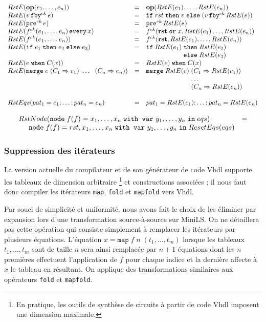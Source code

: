\documentclass[a4paper]{article}
\newcommand{\minils}{{\sc MiniLS}}
\newcommand{\vhdl}{{\sc Vhdl}}
\newcommand{\mybox}[1]{\mbox{\tt{#1}}}
\newcommand{\ind}[0]{\hspace{0.5cm}}
\newcommand{\Node}[4]{\mybox{node} \; f(#1) = #2 \; \mybox{with var} \
  #3 \; \mybox{in} \; #4}
\newcommand{\Op}[2]{\mybox{\bf{op}}(#1,\dots,#2)}
\newcommand{\Fby}[2]{#1 \, \mybox{fby}^{ck} \, #2}
\newcommand{\Pre}[1]{\mybox{pre}^{ck} \, #1}
\newcommand{\Every}[4]{#1^{ck}(#2,\dots,#3) \, \mybox{every} \, #4}
\newcommand{\App}[2]{#1^{ck}(#2)}
\newcommand{\If}[3]{\mybox{if} \; #1 \; \mybox{then} \; #2 \; \mybox{else} \; #3}
\newcommand{\When}[3]{#1 \; \mybox{when} \; #2(#3)}
\newcommand{\Merge}[5]{\mybox{merge} \; #1 \; (#2 \Rightarrow #3) \; \dots \; \
  (#4 \Rightarrow #5)}
\newcommand{\Map}[3]{\mathtt{map} \; #1\; n\; (#2,\dots,#3)}
\begin{document}
\[
\begin{array}{lcl}
  \re{\Op{e_1}{e_n}} & = & \Op{\re{e_1}}{\re{e_n}} \\
  \re{\Fby{v}{e}} & = & \If{rst}{v}{(\Fby{v}{\re{e}})} \\
  \re{\Pre{e}} & = & \Pre{\re{e}} \\
  \re{\Every{f}{e_1}{e_n}{x}} & = & \App{f}{\mathbf{rst} \; \mathtt{or} \;
    x, \re{e_1} \dots, \re{e_n}} \\
  \re{\App{f}{e_1,\dots,e_n}} & = &
  \App{f}{\mathbf{rst},\re{e_1},\dots,\re{e_n}} \\
  \re{\If{e_1}{e_2}{e_3}} & = & \If{\re{e_1}}{\re{e_2}\\ & & \hspace{1.9cm}}
  {\re{e_3}} \\
  \re{\When{e}{C}{x}} & = & \When{\re{e}}{C}{x} \\
  \re{\Merge{e}{C_1}{e_1}{C_n}{e_n}} & = &
  \mybox{merge} \; \re{e} \; (C_1 \Rightarrow \re{e_1}) \\
  & & \hspace{2.4cm} \dots \\
  & & \hspace{2.4cm} (C_n \Rightarrow \re{e_n})
\\ \\
RstEqs(pat_1 = e_1;\dots;pat_n = e_n) & = &
  pat_1 = \re{e_1};\dots;pat_n = \re{e_n} \\
  \end{array}
\]

\[
\begin{array}{ll}
  \rstn{\Node{f}{x_1,\dots,x_n}{y_1,\dots,y_n}{eqs}} & = \\
  \ind \Node{f}{rst,x_1,\dots,x_n}{y_1,\dots,y_n}{ResetEqs(eqs)}
\end{array}
\]

\subsubsection{Suppression des itérateurs}

La version actuelle du compilateur et de son générateur de code \vhdl{} supporte
les tableaux de dimension arbitraire \footnote{En pratique, les outils de
  synthèse de circuits à partir de code \vhdl{} imposent une dimension maximale.}
et constructions associées ; il nous faut donc compiler les itérateurs
\texttt{map}, \texttt{fold} et \texttt{mapfold} vers \vhdl{}.

Par souci de simplicité et uniformité, nous avons fait le choix de les
éliminer par expansion lors d'une transformation source-à-source sur
\minils. On ne détaillera pas cette opération qui consiste simplement à
remplacer les itérateurs par plusieurs équations. L'équation $x =
\Map{f}{t_1}{t_m}$ lorsque les tableaux $t_1, \dots, t_m$ sont de taille $n$
sera ainsi remplacée par $n + 1$ équations dont les $n$ premières
effectuent l'application de $f$ pour chaque indice et la dernière affecte à
$x$ le tableau en résultant. On applique des transformations similaires aux
opérateurs \texttt{fold} et \texttt{mapfold}.
\end{document}
